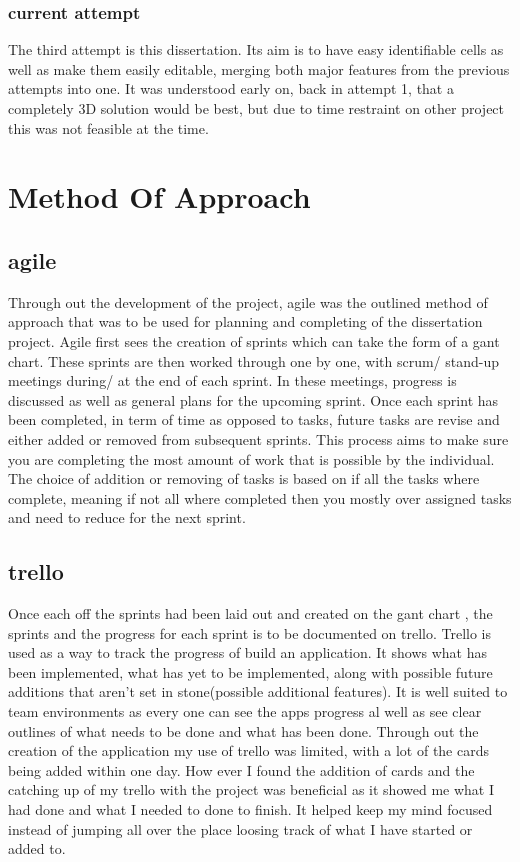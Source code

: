 
\subsubsection{current attempt}
The third attempt is this dissertation. Its aim is to have easy identifiable cells as well as make them easily editable, merging both major features from the previous attempts into one. It was understood early on, back in attempt 1, that a completely 3D solution would be best, but due to time restraint on other project this was not feasible at the time.




\section{Method Of Approach}
\subsection{agile}
Through out the development of the project, agile was the outlined method of approach that was to be used for planning and completing of the dissertation project. Agile first sees the creation of sprints which can take the form of a gant chart. These sprints are then worked through one by one, with scrum/ stand-up meetings during/ at the end of each sprint. In these meetings, progress is discussed as well as general plans for the upcoming sprint. Once each sprint has been completed, in term of time as opposed to tasks, future tasks are revise and either added or removed from subsequent sprints. This process aims to make sure you are completing the most amount of work that is possible by the individual. The choice of addition or removing of tasks is based on if all the tasks where complete, meaning if not all where completed then you mostly over assigned tasks and need to reduce for the next sprint.
 
\subsection{trello}
Once each off the sprints had been laid out and created on the gant chart , the sprints and the progress for each sprint is to be documented on trello.
Trello is used as a way to track the progress of build an application. It shows what has been implemented, what has yet to be implemented, along with possible future additions that aren't set in stone(possible additional features). It is well suited to team environments as every one can see the apps progress al well as see clear outlines of what needs to be done and what has been done. 
Through out the creation of the application my use of trello was limited, with a lot of the cards being added within one day. How ever I found the addition of cards and the catching up of my trello with the project was beneficial as it showed me what I had done and what I needed to done to finish. It helped keep my mind focused instead of  jumping all over the place loosing track of what I have started or added to.

